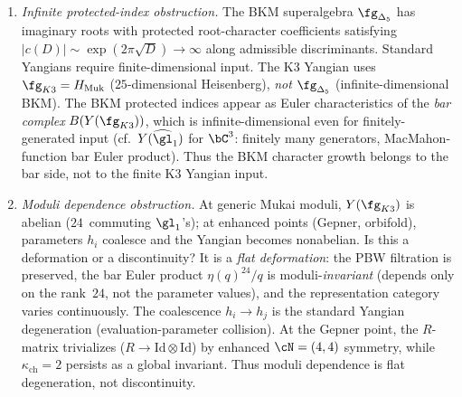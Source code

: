 \begin{remark}
\begin{enumerate}[label=\textbf{A\arabic*.}, leftmargin=2.5em]
\item \emph{Infinite protected-index obstruction.}
The BKM superalgebra $\fg_{\Delta_5}$ has imaginary roots with
protected root-character coefficients satisfying
$|c(D)| \sim \exp(2\pi\sqrt{D}) \to \infty$ along admissible
discriminants.
Standard Yangians require finite-dimensional input.
The K3 Yangian uses $\fg_{K3} = H_{\mathrm{Muk}}$
($25$-dimensional Heisenberg), \emph{not} $\fg_{\Delta_5}$
(infinite-dimensional BKM). The BKM protected indices
appear as Euler characteristics of the \emph{bar complex}
$B(Y(\fg_{K3}))$, which is infinite-dimensional even for
finitely-generated input (cf.\ $Y(\widehat{\gl}_1)$ for $\bC^3$:
finitely many generators, MacMahon-function bar Euler product).
Thus the BKM character growth belongs to the bar side, not to the
finite K3 Yangian input.

\item \emph{Moduli dependence obstruction.}
At generic Mukai moduli, $Y(\fg_{K3})$ is abelian
($24$~commuting $\gl_1$'s); at enhanced points (Gepner, orbifold),
parameters $h_i$ coalesce and the Yangian becomes nonabelian.
Is this a deformation or a discontinuity? It is a \emph{flat
deformation}: the PBW filtration is preserved, the bar Euler product
$\eta(q)^{24}/q$ is moduli-\emph{invariant}
(depends only on the rank~$24$, not the parameter values),
and the representation category varies continuously.
The coalescence $h_i \to h_j$ is the standard Yangian degeneration
(evaluation-parameter collision). At the Gepner point, the
$R$-matrix trivializes ($R \to \mathrm{Id} \otimes \mathrm{Id}$)
by enhanced $\cN = (4,4)$ symmetry, while $\kappa_{\mathrm{ch}} = 2$
persists as a global invariant.
Thus moduli dependence is flat degeneration, not discontinuity.


\end{enumerate}
\end{remark}

